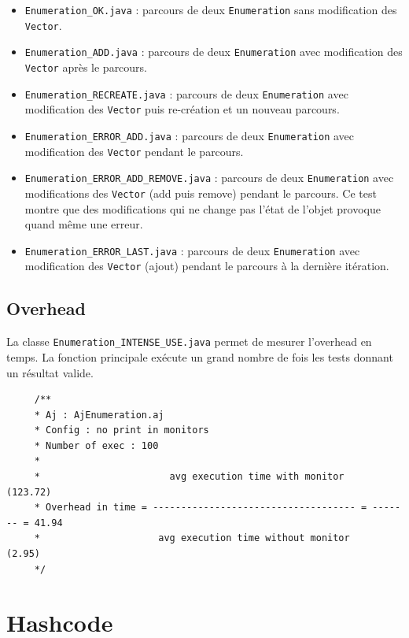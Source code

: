 \documentclass{article}
\begin{document}
\begin{itemize}
  \item \texttt{Enumeration\_OK.java} : parcours de deux \texttt{Enumeration} sans modification des \texttt{Vector}.
  \item \texttt{Enumeration\_ADD.java} : parcours de deux \texttt{Enumeration}
  avec modification des \texttt{Vector} après le parcours.
  \item \texttt{Enumeration\_RECREATE.java} : parcours de deux \texttt{Enumeration}
  avec modification des \texttt{Vector} puis re-création et un nouveau
  parcours.
  \item \texttt{Enumeration\_ERROR\_ADD.java} : parcours de deux \texttt{Enumeration}
  avec modification des \texttt{Vector} pendant le parcours.
  \item \texttt{Enumeration\_ERROR\_ADD\_REMOVE.java} : parcours de deux \texttt{Enumeration}
  avec modifications des \texttt{Vector} (add puis remove) pendant le parcours.
  Ce test montre que des modifications qui ne change pas l'état de l'objet
  provoque quand même une erreur.
  \item \texttt{Enumeration\_ERROR\_LAST.java} : parcours de deux \texttt{Enumeration}
  avec modification des \texttt{Vector} (ajout) pendant le parcours à la
  dernière itération.
\end{itemize}

\subsection{Overhead}

La classe \texttt{Enumeration\_INTENSE\_USE.java} permet de mesurer l'overhead
en temps.
La fonction principale exécute un grand nombre de fois les tests donnant un
résultat valide.

\vspace{0.3cm}
\begin{verbatim}
     /**
     * Aj : AjEnumeration.aj
     * Config : no print in monitors 
     * Number of exec : 100
     * 
     *                       avg execution time with monitor     (123.72)
     * Overhead in time = ------------------------------------ = ------- = 41.94
     *                     avg execution time without monitor     (2.95)
     */
\end{verbatim}

\section{Hashcode}
\end{document}
